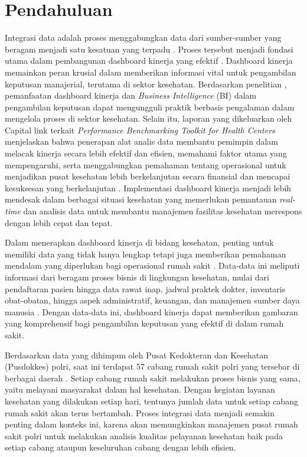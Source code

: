 \section{Pendahuluan}
\label{sec:pendahuluan}


Integrasi data adalah proses menggabungkan data dari sumber-sumber yang beragam menjadi satu kesatuan yang terpadu \citet{Neang2021DataIA}. Proses tersebut menjadi fondasi utama dalam pembangunan dashboard kinerja yang efektif \citet{mutawalli2021pengembangan}. Dashboard kinerja memainkan peran krusial dalam memberikan informasi vital untuk pengambilan keputusan manajerial, terutama di sektor kesehatan. Berdasarkan penelitian \citet{Basile2023}, pemanfaatan dashboard kinerja dan \emph{Business Intelligence} (BI) dalam pengambilan keputusan dapat mengungguli praktik berbasis pengalaman dalam mengelola proses di sektor kesehatan. Selain itu, laporan yang dikeluarkan oleh Capital link terkait \emph{Performance Benchmarking Toolkit for Health Centers} menjelaskan bahwa penerapan alat analis data membantu pemimpin dalam melacak kinerja secara lebih efektif dan efisien, memahami faktor utama yang mempengaruhi, serta menggabungkan pemahaman tentang operasional untuk menjadikan pusat kesehatan lebih berkelanjutan secara finansial dan mencapai kesuksesan yang berkelanjutan \citet{CapitalLink2017}. Implementasi dashboard kinerja menjadi lebih mendesak dalam berbagai situasi kesehatan yang memerlukan pemantauan \emph{real-time} dan analisis data untuk membantu manajemen fasilitas kesehatan merespons dengan lebih cepat dan tepat.

Dalam menerapkan dashboard kinerja di bidang kesehatan, penting untuk memiliki data yang tidak hanya lengkap tetapi juga memberikan pemahaman mendalam yang diperlukan bagi operasional rumah sakit \citet{Basile2023}. Data-data ini meliputi informasi dari beragam proses bisnis di lingkungan kesehatan, mulai dari pendaftaran pasien hingga data rawat inap, jadwal praktek dokter, inventaris obat-obatan, hingga aspek administratif, keuangan, dan manajemen sumber daya manusia \citet{Basile2023}. Dengan data-data ini, dashboard kinerja dapat memberikan gambaran yang komprehensif bagi pengambilan keputusan yang efektif di dalam rumah sakit.

Berdasarkan data yang dihimpun oleh Pusat Kedokteran dan Kesehatan (Pusdokkes) polri, saat ini terdapat 57 cabang rumah sakit polri yang tersebar di berbagai daerah \citet{Aziz2023OptimalisasiPD}. Setiap cabang rumah sakit melakukan proses bisnis yang sama, yaitu melayani masyarakat dalam hal kesehatan. Dengan kegiatan layanan kesehatan yang dilakukan setiap hari, tentunya jumlah data untuk setiap cabang rumah sakit akan terus bertambah. Proses integrasi data menjadi semakin penting dalam konteks ini, karena akan memungkinkan manajemen pusat rumah sakit polri untuk melakukan analisis kualitas pelayanan kesehatan baik pada setiap cabang ataupun keseluruhan cabang dengan lebih efisien.


